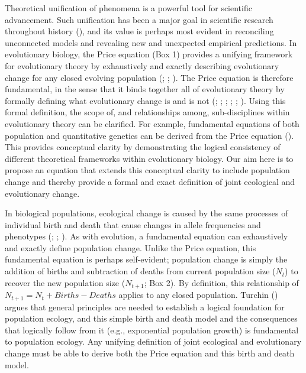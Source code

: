 \documentclass[
]{article}
\begin{document}
Theoretical unification of phenomena is a powerful tool for scientific
advancement. Such unification has been a major goal in scientific
research throughout history (),
and its value is perhaps most evident in reconciling unconnected models
and revealing new and unexpected empirical predictions. In evolutionary
biology, the Price equation (Box 1) provides a unifying framework for
evolutionary theory by exhaustively and exactly describing evolutionary
change for any closed evolving population
(; ; ). The Price
equation is therefore fundamental, in the sense that it binds together
all of evolutionary theory by formally defining what evolutionary change
is and is not (;
; ; ;
; ). Using this formal definition, the scope of, and
relationships among, sub-disciplines within evolutionary theory can be
clarified. For example, fundamental equations of both population and
quantitative genetics can be derived from the Price equation
(). This provides conceptual
clarity by demonstrating the logical consistency of different
theoretical frameworks within evolutionary biology. Our aim here is to
propose an equation that extends this conceptual clarity to include
population change and thereby provide a formal and exact definition of
joint ecological and evolutionary change.

In biological populations, ecological change is caused by the same
processes of individual birth and death that cause changes in allele
frequencies and phenotypes (;
;
). As with evolution, a
fundamental equation can exhaustively and exactly define population
change. Unlike the Price equation, this fundamental equation is perhaps
self-evident; population change is simply the addition of births and
subtraction of deaths from current population size (\(N_{t}\)) to
recover the new population size (\(N_{t+1}\); Box 2). By definition,
this relationship of \(N_{t+1} = N_{t} + Births - Deaths\) applies to
any closed population. Turchin () argues
that general principles are needed to establish a logical foundation for
population ecology, and this simple birth and death model and the
consequences that logically follow from it (e.g., exponential population
growth) is fundamental to population ecology. Any unifying definition of
joint ecological and evolutionary change must be able to derive both the
Price equation and this birth and death model.
\end{document}
